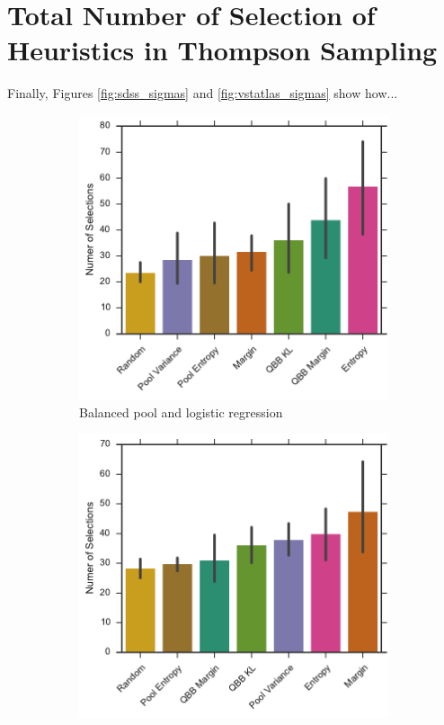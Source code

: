 \section{Total Number of Selection of Heuristics in Thompson Sampling}

Finally, Figures \ref{fig:sdss_sigmas} and \ref{fig:vstatlas_sigmas} show how...

\begin{figure}[p]
	\centering
	\begin{subfigure}{.5\textwidth}
		\centering
		\includegraphics[width=\textwidth]{figures/5_thompson/vstatlas_bl_no_selections}
		\caption{Balanced pool and logistic regression}
		\label{fig:sdss_bl_no_selections}
	\end{subfigure}%
	\begin{subfigure}{.5\textwidth}
		\centering
		\includegraphics[width=\linewidth]{figures/5_thompson/sdss_br_no_selections}

\end{subfigure}
\end{figure}
